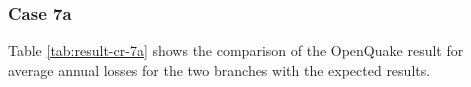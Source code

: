 \subsubsection{Case 7a}



Table \ref{tab:result-cr-7a} shows the comparison of the OpenQuake result for average annual losses for the two branches with the expected results.

